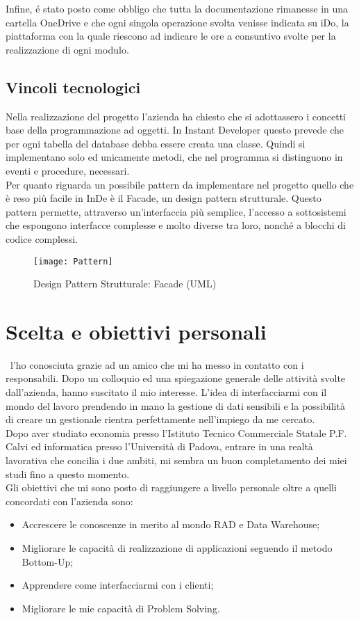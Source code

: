 Infine, é stato posto come obbligo che tutta la documentazione rimanesse in una cartella OneDrive e che ogni singola operazione svolta venisse indicata su iDo, la piattaforma con la quale riescono ad indicare le ore a consuntivo svolte per la realizzazione di ogni modulo.


\subsection{Vincoli tecnologici}
Nella realizzazione del progetto l'azienda ha chiesto che si adottassero i concetti base della programmazione ad oggetti. In Instant Developer questo prevede che per ogni tabella del database debba essere creata una classe. Quindi si implementano solo ed unicamente metodi, che nel programma si distinguono in eventi e procedure, necessari. \\


Per quanto riguarda un possibile pattern da implementare nel progetto quello che è reso più facile in InDe è il Facade, un design pattern strutturale. Questo pattern permette, attraverso un'interfaccia più semplice, l'accesso a sottosistemi che espongono interfacce complesse e molto diverse tra loro, nonché a blocchi di codice complessi. 


\begin{figure}[!h] 
	\centering 
	\texttt{[image: Pattern]} 
	\caption{Design Pattern Strutturale: Facade (UML)}
	\label{Pattern}
\end{figure}


\section{Scelta e obiettivi personali}
\azienda\ l'ho conosciuta grazie ad un amico che mi ha messo in contatto con i responsabili. Dopo un colloquio ed una spiegazione generale delle attività svolte dall'azienda, hanno suscitato il mio interesse. L'idea di interfacciarmi con il mondo del lavoro prendendo in mano la gestione di dati sensibili e la possibilità di creare un gestionale rientra perfettamente nell'impiego da me cercato.\\
Dopo aver studiato economia presso l'Istituto Tecnico Commerciale Statale P.F. Calvi ed informatica presso l'Università di Padova, entrare in una realtà lavorativa che concilia i due ambiti, mi sembra un buon completamento dei miei studi fino a questo momento.\\

Gli obiettivi che mi sono posto di raggiungere a livello personale oltre a quelli concordati con l'azienda sono: 
\begin{itemize}
	\item Accrescere le conoscenze in merito al mondo RAD e Data Warehouse;
	\item Migliorare le capacità di realizzazione di applicazioni seguendo il metodo Bottom-Up;
	\item Apprendere come interfacciarmi con i clienti;
	\item Migliorare le mie capacità di Problem Solving.
\end{itemize}
\newpage
